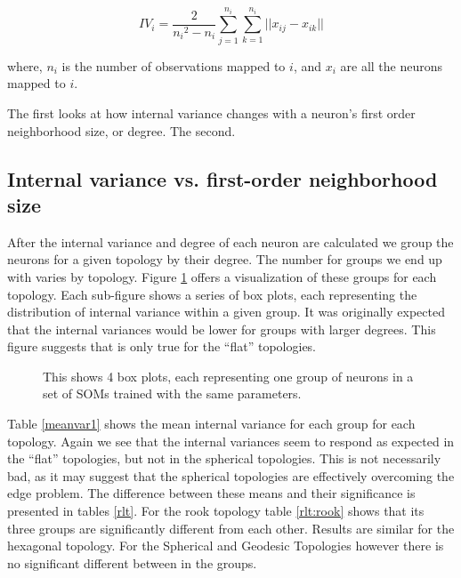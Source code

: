  \begin{equation}
   {IV_i} = \frac{2}{{n_i}^2-{n_i}}\sum_{j=1}^{n_i}\sum_{k=1}^{n_i} ||{x_{ij}}-{x_{ik}}||
 \label{eqno1}
 \end{equation}

where, \(n_i\) is the number of observations mapped to \(i\), and \(x_i\) are
all the neurons mapped to \(i\).

The first looks at how internal variance changes with a neuron's first
order neighborhood size, or degree.  The second.


\subsection{Internal variance vs. first-order neighborhood size}
After the internal variance and degree of each neuron are calculated we
group the neurons for a given topology by their degree. The number for groups
we end up with varies by topology. Figure \ref{boxplot} offers a visualization
of these groups for each topology.  Each sub-figure shows a series of box
plots, each representing the distribution of internal variance within a given
group.  It was originally expected that the internal variances would be lower
for groups with larger degrees. This figure suggests that is only true for the
``flat'' topologies.

\begin{figure}[hbt]
\label{boxplot}
\centering
{}
\caption{This shows 4 box plots, each representing one group of neurons in a set
of SOMs trained with the same parameters.}
\end{figure}

Table \ref{meanvar1} shows the mean internal variance for each group for each
topology. Again we see that the internal variances seem to respond as expected
in the ``flat'' topologies, but not in the spherical topologies.  This is not
necessarily bad, as it may suggest that the spherical topologies are
effectively overcoming the edge problem.  The difference between these means
and their significance is presented in tables \ref{rlt}.  For the rook
topology table \ref{rlt:rook} shows that its three groups are significantly
different from each other. Results are similar for the hexagonal topology. For
the Spherical and Geodesic Topologies however there is no significant
different between in the groups.

